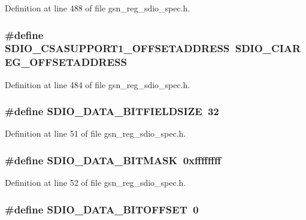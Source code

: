 Definition at line 488 of file gsn\_\-reg\_\-sdio\_\-spec.h.

\hypertarget{a00571_aa987527a6787c343e082b885a2ae850d}{
\subsubsection[{SDIO\_\-CSASUPPORT1\_\-OFFSETADDRESS}]{\setlength{\rightskip}{0pt plus 5cm}\#define SDIO\_\-CSASUPPORT1\_\-OFFSETADDRESS~SDIO\_\-CIAREG\_\-OFFSETADDRESS}}
\label{a00571_aa987527a6787c343e082b885a2ae850d}


Definition at line 484 of file gsn\_\-reg\_\-sdio\_\-spec.h.

\hypertarget{a00571_a314aeb6793cc136ea890cbe2064266e1}{
\subsubsection[{SDIO\_\-DATA\_\-BITFIELDSIZE}]{\setlength{\rightskip}{0pt plus 5cm}\#define SDIO\_\-DATA\_\-BITFIELDSIZE~32}}
\label{a00571_a314aeb6793cc136ea890cbe2064266e1}


Definition at line 51 of file gsn\_\-reg\_\-sdio\_\-spec.h.

\hypertarget{a00571_ad6b7b9a59cf2699cd3a236cdbb5881d9}{
\subsubsection[{SDIO\_\-DATA\_\-BITMASK}]{\setlength{\rightskip}{0pt plus 5cm}\#define SDIO\_\-DATA\_\-BITMASK~0xffffffff}}
\label{a00571_ad6b7b9a59cf2699cd3a236cdbb5881d9}


Definition at line 52 of file gsn\_\-reg\_\-sdio\_\-spec.h.

\hypertarget{a00571_a24306f5b8565ed6369781cac37162ee5}{
\subsubsection[{SDIO\_\-DATA\_\-BITOFFSET}]{\setlength{\rightskip}{0pt plus 5cm}\#define SDIO\_\-DATA\_\-BITOFFSET~0}}
\label{a00571_a24306f5b8565ed6369781cac37162ee5}


